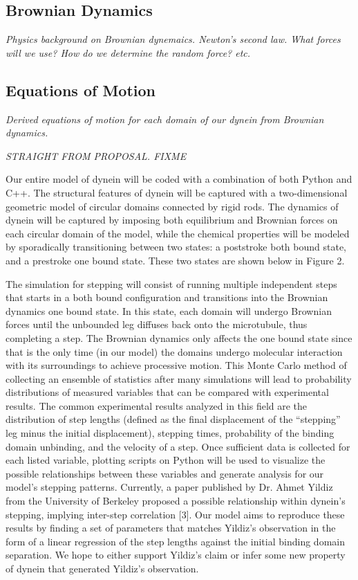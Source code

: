 \subsection{Brownian Dynamics}
\label{sec:BrownianDynamics}
\textit{Physics background on Brownian dynemaics. Newton's second law. What forces will we use? How do we determine the random force? etc.}

\subsection{Equations of Motion}
\textit{Derived equations of motion for each domain of our dynein from Brownian dynamics.}


\textit{STRAIGHT FROM PROPOSAL. FIXME}


Our entire model of dynein will be coded with a combination of both Python and C++. The structural features of dynein will be captured with a two-dimensional geometric model of circular domains connected by rigid rods. The dynamics of dynein will be captured by imposing both equilibrium and Brownian forces on each circular domain of the model, while the chemical properties will be modeled by sporadically transitioning between two states: a poststroke both bound state, and a prestroke one bound state. These two states are shown below in Figure 2.

The simulation for stepping will consist of running multiple independent steps that starts in a both bound configuration and transitions into the Brownian dynamics one bound state. In this state, each domain will undergo Brownian forces until the unbounded leg diffuses back onto the microtubule, thus completing a step. The Brownian dynamics only affects the one bound state since that is the only time (in our model) the domains undergo molecular interaction with its surroundings to achieve processive motion. This Monte Carlo method of collecting an ensemble of statistics after many simulations will lead to probability distributions of measured variables that can be compared with experimental results. The common experimental results analyzed in this field are the distribution of step lengths (defined as the final displacement of the “stepping” leg minus the initial displacement), stepping times, probability of the binding domain unbinding, and the velocity of a step. Once sufficient data is collected for each listed variable, plotting scripts on Python will be used to visualize the possible relationships between these variables and generate analysis for our model’s stepping patterns. Currently, a paper published by Dr. Ahmet Yildiz from the University of Berkeley proposed a possible relationship within dynein’s stepping, implying inter-step correlation [3]. Our model aims to reproduce these results by finding a set of parameters that matches Yildiz’s observation in the form of a linear regression of the step lengths against the initial binding domain separation. We hope to either support Yildiz’s claim or infer some new property of dynein that generated Yildiz’s observation.